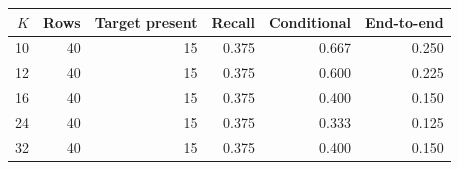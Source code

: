 \begin{tabular}{rrrrrr}
\toprule
$K$ & Rows & Target present & Recall & Conditional & End-to-end \\
\midrule
10 & 40 & 15 & 0.375 & 0.667 & 0.250 \\
12 & 40 & 15 & 0.375 & 0.600 & 0.225 \\
16 & 40 & 15 & 0.375 & 0.400 & 0.150 \\
24 & 40 & 15 & 0.375 & 0.333 & 0.125 \\
32 & 40 & 15 & 0.375 & 0.400 & 0.150 \\
\bottomrule
\end{tabular}
